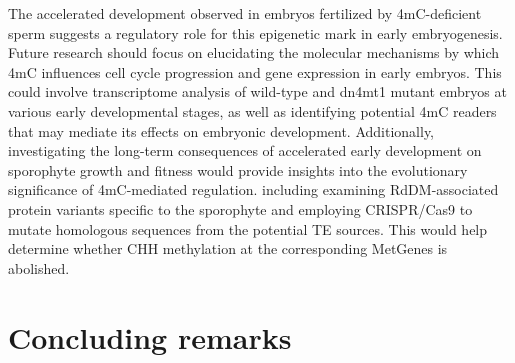 The accelerated development observed in embryos fertilized by 4mC-deficient sperm suggests a regulatory role for this epigenetic mark in early embryogenesis. Future research should focus on elucidating the molecular mechanisms by which 4mC influences cell cycle progression and gene expression in early embryos. This could involve transcriptome analysis of wild-type and dn4mt1 mutant embryos at various early developmental stages, as well as identifying potential 4mC readers that may mediate its effects on embryonic development. Additionally, investigating the long-term consequences of accelerated early development on sporophyte growth and fitness would provide insights into the evolutionary significance of 4mC-mediated regulation.
 including examining RdDM-associated protein variants specific to the sporophyte and employing CRISPR/Cas9 to mutate homologous sequences from the potential TE sources. This would help determine whether CHH methylation at the corresponding MetGenes is abolished.

\section{Concluding remarks}
